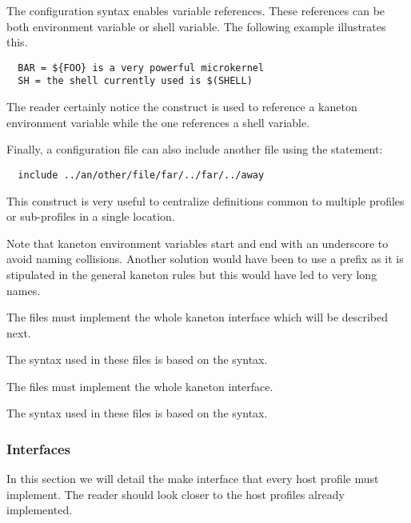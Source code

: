 The configuration syntax enables variable references. These references can
be both environment variable or shell variable. The following example
illustrates this.

\begin{verbatim}
  BAR = ${FOO} is a very powerful microkernel
  SH = the shell currently used is $(SHELL)
\end{verbatim}

The reader certainly notice the \code{\$\{\}} construct is used to reference
a kaneton environment variable while the \code{\$()} one references a shell
variable.

Finally, a configuration file can also include another file using the
 statement:

\begin{verbatim}
  include ../an/other/file/far/../far/../away
\end{verbatim}

This construct is very useful to centralize definitions common to multiple
profiles or sub-profiles in a single location.

Note that kaneton environment variables start and end with an underscore
to avoid naming collisions. Another solution would have been to use a
prefix  as it is stipulated in the general kaneton rules
but this would have led to very long names.



The  files must implement the whole kaneton 
interface which will be described next.

The syntax used in these files is based on the  syntax.



The  files must implement the whole kaneton 
interface.

The syntax used in these files is based on the  syntax.

%
%

\subsubsection{Interfaces}



In this section we will detail the make interface that every host profile
must implement. The reader should look closer to the host profiles already
implemented.


